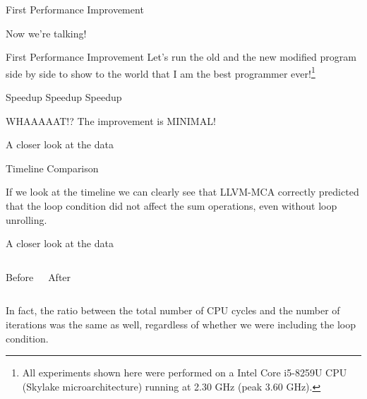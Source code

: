 \begin{frame}{First Performance Improvement}
\begin{block}{Now we're talking!}
\end{block}
\end{frame}


\begin{frame}{First Performance Improvement}
Let's run the old and the new modified program side by side to show to the world that I am the best programmer ever!\footnote{All experiments shown here were performed on a Intel Core i5-8259U CPU (Skylake microarchitecture) running at 2.30 GHz (peak 3.60 GHz).}
\begin{block}{Speedup Speedup Speedup}
\end{block}
\pause
\alert{\centering WHAAAAAT!? The improvement is MINIMAL!\\}
\end{frame}


\begin{frame}{A closer look at the data}
\begin{block}{Timeline Comparison}
\asminput[\tt\fontsize{6.7pt}{7pt}\selectfont]{listings/01_add_reduction_v1_vs_v2_timeline.txt}
\end{block}
If we look at the timeline we can clearly see that LLVM-MCA \alert{correctly predicted} that the loop condition did not affect the sum operations, even without loop unrolling. 
\end{frame}


\begin{frame}{A closer look at the data}
\begin{columns}

\begin{block}{Before}
\end{block}

\begin{block}{After}
\end{block}

\end{columns}
\medskip
In fact, the ratio between the total number of CPU cycles and the number of iterations was the same as well, regardless of whether we were including the loop condition.
\end{frame}


